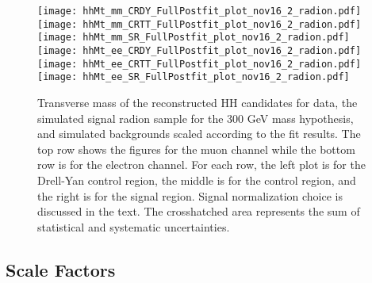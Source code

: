 \begin{figure}[tbp]
  \begin{center}
    \texttt{[image: hhMt\_mm\_CRDY\_FullPostfit\_plot\_nov16\_2\_radion.pdf]}
    \texttt{[image: hhMt\_mm\_CRTT\_FullPostfit\_plot\_nov16\_2\_radion.pdf]}
    \texttt{[image: hhMt\_mm\_SR\_FullPostfit\_plot\_nov16\_2\_radion.pdf]} \\
    \texttt{[image: hhMt\_ee\_CRDY\_FullPostfit\_plot\_nov16\_2\_radion.pdf]}
    \texttt{[image: hhMt\_ee\_CRTT\_FullPostfit\_plot\_nov16\_2\_radion.pdf]}
    \texttt{[image: hhMt\_ee\_SR\_FullPostfit\_plot\_nov16\_2\_radion.pdf]}
    \caption{Transverse mass of the reconstructed HH candidates for data, the simulated signal radion sample
    for the 300 GeV mass hypothesis, and simulated backgrounds scaled according to the fit results. The top
    row shows the figures for the muon channel while the bottom row is for the electron channel. For each row,
    the left plot is for the Drell-Yan control region, the middle is for the \ttbar control region, and the right
    is for the signal region. Signal normalization choice is discussed in the text. The crosshatched area represents
    the sum of statistical and systematic uncertainties.}
    \label{fig:MCcomparisons_radion}
%                                                                                                                 
  \end{center}
\end{figure}







\subsection{Scale Factors}

